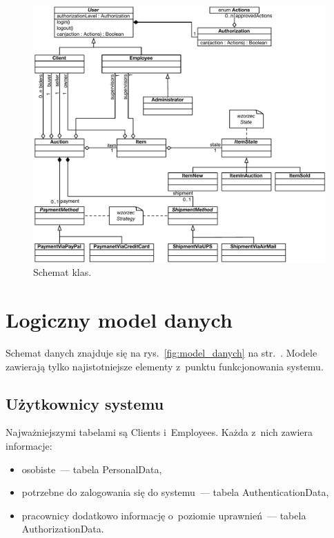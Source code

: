 \documentclass[10pt,a4paper]{article}
\newcommand{\s}[1]{\textsf{#1}}
\begin{document}
\begin{figure}[p]
  \begin{adjustwidth}{-3cm}{-3cm}
    \centering
    \includegraphics{figury/diagram-klas}
    \caption{Schemat klas.}
    \label{fig:diagram_klas}
  \end{adjustwidth}
\end{figure}

\newpage
\section{Logiczny model danych}

Schemat danych znajduje się na rys.~\ref{fig:model_danych} na
str.~\pageref{fig:model_danych}. Modele zawierają tylko najistotniejsze
elementy z~punktu funkcjonowania systemu.

\subsection{Użytkownicy systemu}

\noindent Najważniejszymi tabelami są \s{Clients} i~\s{Employees}. Każda z~nich
zawiera informacje:

\begin{itemize}
  \item osobiste~--- tabela \s{PersonalData},
  \item potrzebne do zalogowania się do systemu~--- tabela
    \s{AuthenticationData},
  \item pracownicy dodatkowo informację o~poziomie uprawnień~--- tabela
    \s{AuthorizationData}.
\end{itemize}
\end{document}
